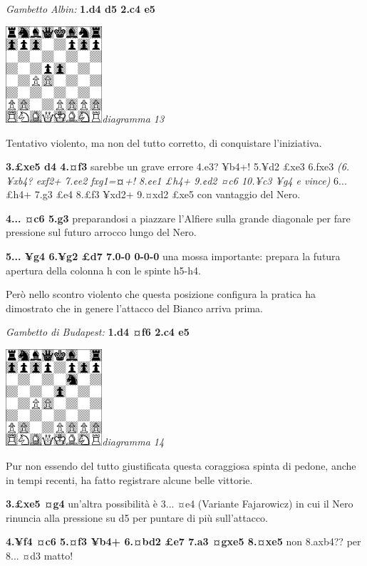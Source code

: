 \documentclass[
]{article}
\begin{document}
\emph{Gambetto Albin:} \textbf{1.d4 d5 2.c4 e5}

\includegraphics[width=1.40972in,height=1.40972in]{vertopal_109f12be458a423d8f3cc838880eaea2/media/image13.png}\emph{diagramma
13}

Tentativo violento, ma non del tutto corretto, di conquistare
l'iniziativa.

\textbf{3.£xe5 d4 4.¤f3} sarebbe un grave errore 4.e3? ¥b4+! 5.¥d2 £xe3
6.fxe3 \emph{(6.¥xb4? exf2+ 7.¢e2 fxg1=}\textbf{¤}\emph{+! 8.¢e1 £h4+
9.¢d2 ¤c6 10.¥c3 ¥g4 e vince)} 6... £h4+ 7.g3 £e4 8.£f3 ¥xd2+ 9.¤xd2
£xe5 con vantaggio del Nero.

\textbf{4... ¤c6 5.g3} preparandosi a piazzare l'Alfiere sulla grande
diagonale per fare pressione sul futuro arrocco lungo del Nero.

\textbf{5... ¥g4 6.¥g2 £d7 7.0-0 0-0-0} una mossa importante: prepara la
futura apertura della colonna h con le spinte h5-h4.

Però nello scontro violento che questa posizione configura la pratica ha
dimostrato che in genere l'attacco del Bianco arriva prima.

\emph{Gambetto di Budapest:} \textbf{1.d4 ¤f6 2.c4 e5}

\includegraphics[width=1.40972in,height=1.40972in]{vertopal_109f12be458a423d8f3cc838880eaea2/media/image14.png}\emph{diagramma
14}

Pur non essendo del tutto giustificata questa coraggiosa spinta di
pedone, anche in tempi recenti, ha fatto registrare alcune belle
vittorie.

\textbf{3.£xe5 ¤g4} un'altra possibilità è 3... ¤e4 (Variante
Fajarowicz) in cui il Nero rinuncia alla pressione su d5 per puntare di
più sull'attacco.

\textbf{4.¥f4 ¤c6 5.¤f3 ¥b4+ 6.¤bd2 £e7 7.a3 ¤gxe5 8.¤xe5} non 8.axb4??
per 8... ¤d3 matto!
\end{document}
